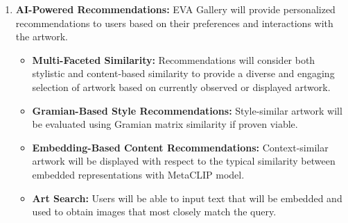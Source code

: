 \begin{enumerate}
\item \textbf{AI-Powered Recommendations:} EVA Gallery will provide personalized recommendations to users based on their preferences and interactions with the artwork.

    \begin{itemize}
        \item \textbf{Multi-Faceted Similarity:} Recommendations will consider both stylistic and content-based similarity to provide a diverse and engaging selection of artwork based on currently observed or displayed artwork.
        \item \textbf{Gramian-Based Style Recommendations:} Style-similar artwork will be evaluated using Gramian matrix similarity if proven viable.
        \item \textbf{Embedding-Based Content Recommendations:} Context-similar artwork will be displayed with respect to the typical similarity between embedded representations with MetaCLIP model.
        \item \textbf{Art Search:} Users will be able to input text that will be embedded and used to obtain images that most closely match the query.
    \end{itemize}
\end{enumerate}


\newpage
